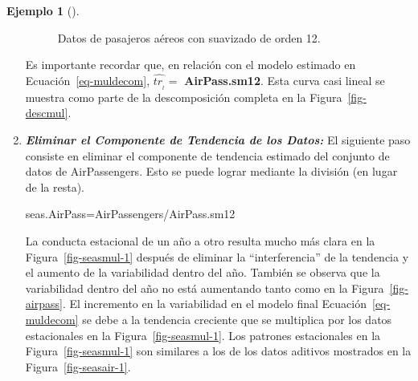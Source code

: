 \documentclass[
  us-letterpaper,
]{scrreprt}
\newenvironment{Shaded}{\begin{snugshade}}{\end{snugshade}}
\newcommand{\NormalTok}[1]{\textcolor[rgb]{0.00,0.23,0.31}{#1}}
\newcommand{\OtherTok}[1]{\textcolor[rgb]{0.00,0.23,0.31}{#1}}
\newcommand{\SpecialCharTok}[1]{\textcolor[rgb]{0.37,0.37,0.37}{#1}}
\theoremstyle{plain}
\theoremstyle{definition}
\newtheorem{example}{Ejemplo}[chapter]
\theoremstyle{plain}
\theoremstyle{definition}
\theoremstyle{remark}
\begin{document}
\begin{example}[]
\begin{tcolorbox}
\begin{enumerate}
\begin{figure}[H]
{  }

  \caption{\label{fig-smap}Datos de pasajeros aéreos con suavizado de
  orden 12.}

  \end{figure}%

  Es importante recordar que, en relación con el modelo estimado en
  Ecuación~\ref{eq-muldecom}, \(\hat{tr_{_t}} =\) \textbf{AirPass.sm12}.
  Esta curva casi lineal se muestra como parte de la descomposición
  completa en la Figura~\ref{fig-descmul}.
\item
  \textbf{\emph{Eliminar el Componente de Tendencia de los Datos:}} El
  siguiente paso consiste en eliminar el componente de tendencia
  estimado del conjunto de datos de AirPassengers. Esto se puede lograr
  mediante la división (en lugar de la resta).

\begin{Shaded}
\begin{Highlighting}[]
\NormalTok{seas.AirPass}\OtherTok{=}\NormalTok{AirPassengers}\SpecialCharTok{/}\NormalTok{AirPass.sm12}
\end{Highlighting}
\end{Shaded}

  La conducta estacional de un año a otro resulta mucho más clara en la
  Figura~\ref{fig-seasmul-1} después de eliminar la ``interferencia'' de
  la tendencia y el aumento de la variabilidad dentro del año. También
  se observa que la variabilidad dentro del año no está aumentando tanto
  como en la Figura~\ref{fig-airpass}. El incremento en la variabilidad
  en el modelo final Ecuación~\ref{eq-muldecom} se debe a la tendencia
  creciente que se multiplica por los datos estacionales en la
  Figura~\ref{fig-seasmul-1}. Los patrones estacionales en la
  Figura~\ref{fig-seasmul-1} son similares a los de los datos aditivos
  mostrados en la Figura~\ref{fig-seasair-1}.
\end{enumerate}

\begin{figure}[H]

\begin{minipage}{0.50\linewidth}

\end{minipage}
\end{figure}
\end{tcolorbox}
\end{example}
\end{document}
